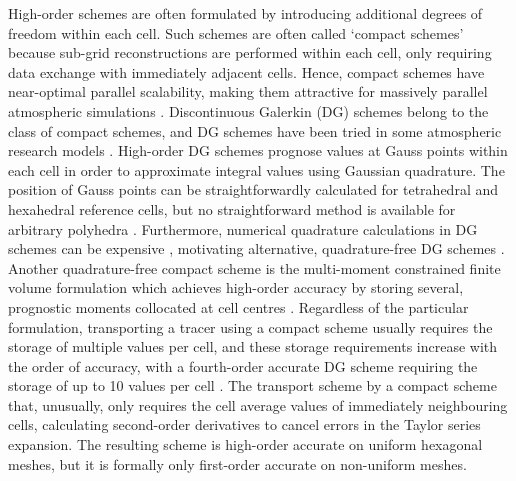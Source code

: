 High-order schemes are often formulated by introducing additional degrees of freedom within each cell.
Such schemes are often called `compact schemes' because sub-grid reconstructions are performed within each cell, only requiring data exchange with immediately adjacent cells.
Hence, compact schemes have near-optimal parallel scalability, making them attractive for massively parallel atmospheric simulations \citep{ullrich2014}.
Discontinuous Galerkin (DG) schemes belong to the class of compact schemes, and DG schemes have been tried in some atmospheric research models \citep{nair2005,giraldo-restelli2008}.
High-order DG schemes prognose values at Gauss points within each cell in order to approximate integral values using Gaussian quadrature.
The position of Gauss points can be straightforwardly calculated for tetrahedral and hexahedral reference cells, but no straightforward method is available for arbitrary polyhedra \citep{costa2017}.
Furthermore, numerical quadrature calculations in DG schemes can be expensive \citep{dumbser2007}, motivating alternative, quadrature-free DG schemes \citep{atkins-shu1998,nair2015}.
Another quadrature-free compact scheme is the multi-moment constrained finite volume formulation which achieves high-order accuracy by storing several, prognostic moments collocated at cell centres \citep{ii-xiao2009}.
Regardless of the particular formulation, transporting a tracer using a compact scheme usually requires the storage of multiple values per cell, and these storage requirements increase with the order of accuracy, with a fourth-order accurate DG scheme requiring the storage of up to 10 values per cell \citep{ullrich2010}.
The transport scheme by \citet{skamarock-gassmann2011} a compact scheme that, unusually, only requires the cell average values of immediately neighbouring cells, calculating second-order derivatives to cancel errors in the Taylor series expansion.
The resulting scheme is high-order accurate on uniform hexagonal meshes, but it is formally only first-order accurate on non-uniform meshes.

